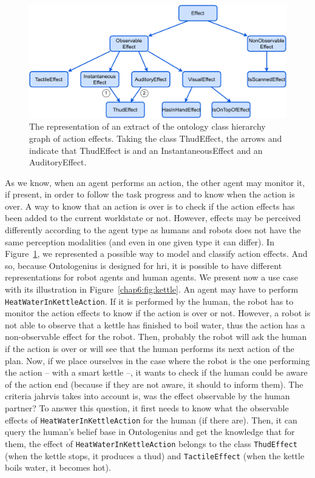 \documentclass[a4paper,11pt,twoside]{StyleThese}
\begin{document}
\begin{figure}[!ht]
	\includegraphics[width=\linewidth]{figures/chapter2/class_effects.pdf}
	\caption{The representation of an extract of the ontology class hierarchy graph of action effects. Taking the class ThudEffect, the arrows  and  indicate that ThudEffect is and an InstantaneousEffect and an AuditoryEffect.}
	\label{chap6:fig:class_effects}
\end{figure}

As we know, when an agent performs an action, the other agent may monitor it, if present, in order to follow the task progress and to know when the action is over. A way to know that an action is over is to check if the action effects has been added to the current worldstate or not. However, effects may be perceived differently according to the agent type as humans and robots does not have the same perception modalities (and even in one given type it can differ). In Figure~\ref{chap6:fig:class_effects}, we represented a possible way to model and classify action effects. And so, because Ontologenius is designed for \acrshort{hri}, it is possible to have different representations for robot agents and human agents. We present now a use case with its illustration in Figure~\ref{chap6:fig:kettle}. An agent may have to perform \verb'HeatWaterInKettleAction'. If it is performed by the human, the robot has to monitor the action effects to know if the action is over or not. However, a robot is not able to observe that a kettle has finished to boil water, thus the action has a non-observable effect for the robot. Then, probably the robot will ask the human if the action is over or will see that the human performs its next action of the plan. Now, if we place ourselves in the case where the robot is the one performing the action -- with a smart kettle --, it wants to check if the human could be aware of the action end (because if they are not aware, it should to inform them). The criteria \acrshort{jahrvis} takes into account is, was the effect observable by the human partner? To answer this question, it first needs to know what the observable effects of \verb'HeatWaterInKettleAction' for the human (if there are). Then, it can query the human's belief base in Ontologenius and get the knowledge that for them, the effect of \verb'HeatWaterInKettleAction' belongs to the class \verb'ThudEffect' (when the kettle stops, it produces a thud) and \verb'TactileEffect' (when the kettle boils water, it becomes hot).
	
\end{document}
